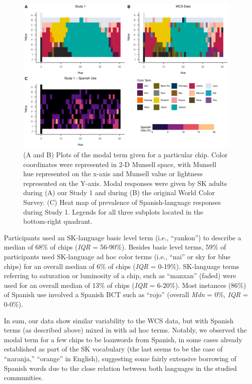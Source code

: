 \documentclass[
  english,
  ,apa7,floatsintext]{apa6}
\begin{document}
\begin{figure}
\centering
\includegraphics{amazon_color_files/figure-latex/study1-figure-1.pdf}
\caption{\label{fig:study1-figure}(A and B) Plots of the modal term given for a particular chip. Color coordinates were represented in 2-D Munsell space, with Munsell hue represented on the x-axis and Munsell value or lightness represented on the Y-axis. Modal responses were given by SK adults during (A) our Study 1 and during (B) the original World Color Survey. (C) Heat map of prevalence of Spanish-language responses during Study 1. Legends for all three subplots located in the bottom-right quadrant.}
\end{figure}

Participants used an SK-language basic level term (i.e., ``yankon'') to describe a median of 68\% of chips (\emph{IQR} = 56-90\%). Besides basic level terms, 59\% of participants used SK-language ad hoc color terms (i.e., ``nai'' or sky for blue chips) for an overall median of 6\% of chips (\emph{IQR} = 0-19\%). SK-language terms referring to saturation or luminosity of a chip, such as ``manxan'' (faded) were used for an overall median of 13\% of chips (\emph{IQR} = 6-20\%). Most instances (86\%) of Spanish use involved a Spanish BCT such as ``rojo'' (overall \emph{Mdn} = 0\%, \emph{IQR} = 0-0\%).

In sum, our data show similar variability to the WCS data, but with Spanish terms (as described above) mixed in with ad hoc terms. Notably, we observed the modal term for a few chips to be loanwords from Spanish, in some cases already established as part of the SK vocabulary (the last seems to be the case of ``naranja,'' ``orange'' in English), suggesting some fairly extensive borrowing of Spanish words due to the close relation between both languages in the studied communities.
\end{document}
